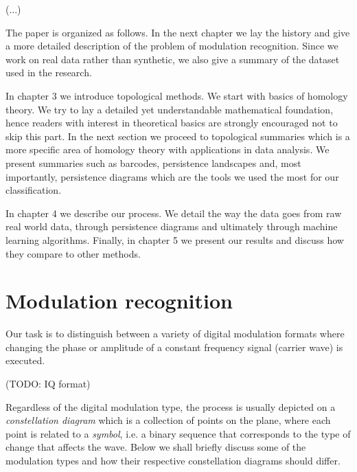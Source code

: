 \documentclass[12pt]{article}
\theoremstyle{plain}
\theoremstyle{definition}
\theoremstyle{remark}
\begin{document}
	(...)
	
	The paper is organized as follows. In the next chapter we lay the history and give a more detailed description of the problem of modulation recognition. Since we work on real data rather than synthetic, we also give a summary of the dataset used in the research.
	
	In chapter 3 we introduce topological methods. We start with basics of homology theory. We try to lay a detailed yet understandable mathematical foundation, hence readers with interest in theoretical basics are strongly encouraged not to skip this part. In the next section we proceed to topological summaries which is a more specific area of homology theory with applications in data analysis. We present summaries such as barcodes, persistence landscapes and, most importantly, persistence diagrams which are the tools we used the most for our classification.
	
	In chapter 4 we describe our process. We detail the way the data goes from raw real world data, through persistence diagrams and ultimately through machine learning algorithms. Finally, in chapter 5 we present our results and discuss how they compare to other methods.
	
	\section{Modulation recognition}
	
	Our task is to distinguish between a variety of digital modulation formats where changing the phase or amplitude of a constant frequency signal (carrier wave) is executed.
	
	(TODO: IQ format)
	
	Regardless of the digital modulation type, the process is usually depicted on a \textit{constellation diagram} which is a collection of points on the plane, where each point is related to a \textit{symbol}, i.e. a binary sequence that corresponds to the type of change that affects the wave. Below we shall briefly discuss some of the modulation types and how their respective constellation diagrams should differ.
	
\end{document}
